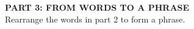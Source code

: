 \begin{center}
\vspace{12pt}
{\Large\bfseries PART 3: FROM WORDS TO A PHRASE}\\[5pt]

Rearrange the words in part 2 to form a phrase.\\[12pt]

\hrulefill
\end{center}